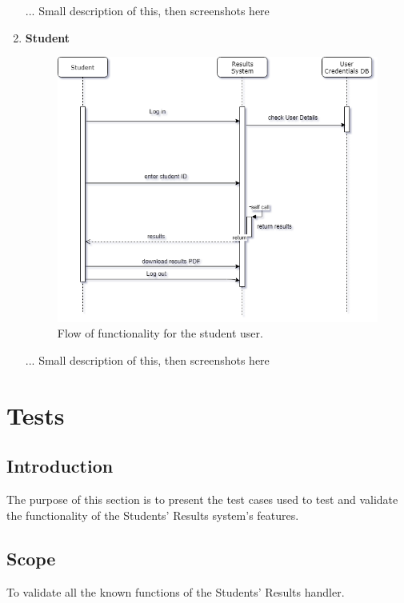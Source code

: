 \begin{enumerate}
\begin{figure}[H]
\end{figure}
... Small description of this, then screenshots here
\item \textbf{Student}
\begin{figure}[H]
\caption{Flow of functionality for the student user.}
\includegraphics[scale=0.5]{images/SequenceStudent.png}
\end{figure}
... Small description of this, then screenshots here
\end{enumerate}
\section{Tests}
\subsection{Introduction}
The purpose of this section is to present the test cases used to test and validate the functionality of the Students' Results system's features.
\subsection{Scope}
To validate all the known functions of the Students' Results handler.
